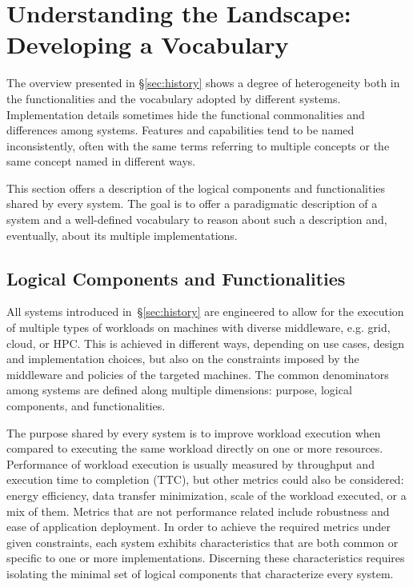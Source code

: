 \documentclass{sig-alternate}
\begin{document}
\section{Understanding the Landscape: Developing a Vocabulary}
\label{sec:understanding}

The overview presented in \S\ref{sec:history} shows a degree of heterogeneity
both in the functionalities and the vocabulary adopted by different \pilotjob
systems. Implementation details sometimes hide the functional commonalities and
differences among \pilotjob systems. Features and capabilities tend to be named
inconsistently, often with the same terms referring to multiple concepts or the
same concept named in different ways.

This section offers a description of the logical components and functionalities
shared by every \pilotjob system. The goal is to offer a paradigmatic
description of a \pilotjob system and a well-defined vocabulary to reason about
such a description and, eventually, about its multiple implementations.


\subsection{Logical Components and Functionalities}
\label{sec:compsandfuncs}

All \pilotjob systems introduced in~\S\ref{sec:history} are engineered to allow
for the execution of multiple types of workloads on machines with diverse
middleware, e.g. grid, cloud, or HPC. This is achieved in different ways,
depending on use cases, design and implementation choices, but also on the
constraints imposed by the middleware and policies of the targeted machines. The
common denominators among \pilotjob systems are defined along multiple
dimensions: purpose, logical components, and functionalities.

The purpose shared by every \pilotjob system is to improve workload execution
when compared to executing the same workload directly on one or more
resources. Performance of workload
execution is usually measured by throughput and execution time to completion
(TTC), but other metrics could also be considered: energy efficiency, data
transfer minimization, scale of the workload executed, or a mix of them. Metrics
that are not performance related include robustness and ease of application
deployment.  In order to achieve the required metrics under given constraints,
each \pilotjob system exhibits characteristics that are both common or specific
to one or more implementations. Discerning these characteristics requires
isolating the minimal set of logical components that characterize every
\pilotjob system.
\end{document}
